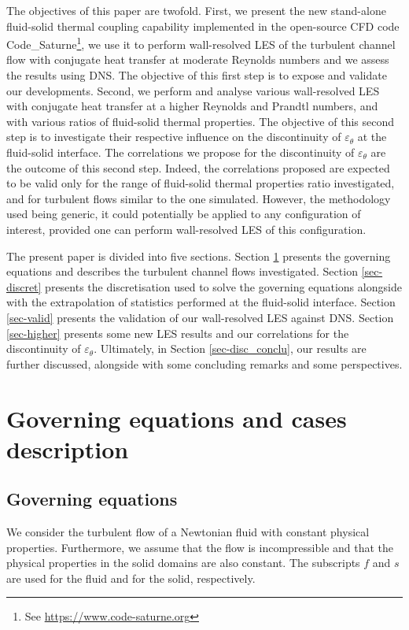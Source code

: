 \documentclass{svjour3}                     %
\begin{document}
The objectives of this paper are twofold.
First, we present the new stand-alone fluid-solid thermal coupling capability implemented in the open-source CFD code {\selectfont Code\_Saturne}\footnote{See \url{https://www.code-saturne.org}}, we use it to perform wall-resolved LES of the turbulent channel flow with conjugate heat transfer at moderate Reynolds numbers and we assess the results using DNS.
The objective of this first step is to expose and validate our developments.
Second, we perform and analyse various wall-resolved LES with conjugate heat transfer at a higher Reynolds and Prandtl numbers, and with various ratios of fluid-solid thermal properties.
The objective of this second step is to investigate their respective influence on the discontinuity of $\varepsilon_\theta$ at the fluid-solid interface.
The correlations we propose for the discontinuity of $\varepsilon_\theta$ are the outcome of this second step.
Indeed, the correlations proposed are expected to be valid only for the range of fluid-solid thermal properties ratio investigated, and for turbulent flows similar to the one simulated.
However, the methodology used being generic, it could potentially be applied to any configuration of interest, provided one can perform wall-resolved LES of this configuration.

The present paper is divided into five sections.
Section \ref{sec-gov_eq_geom} presents the governing equations and describes the turbulent channel flows investigated.
Section \ref{sec-discret} presents the discretisation used to solve the governing equations alongside with the extrapolation of statistics performed at the fluid-solid interface.
Section \ref{sec-valid} presents the validation of our wall-resolved LES against DNS.
Section \ref{sec-higher} presents some new LES results and our correlations for the discontinuity of $\varepsilon_\theta$.
Ultimately, in Section \ref{sec-disc_conclu}, our results are further discussed, alongside with some concluding remarks and some perspectives.

\section{Governing equations and cases description}
\label{sec-gov_eq_geom}

\subsection{Governing equations}
\label{subsec-gov_eq}
We consider the turbulent flow of a Newtonian fluid with constant physical properties.
Furthermore, we assume that the flow is incompressible and that the physical properties in the solid domains are also constant.
The subscripts $f$ and $s$ are used for the fluid and for the solid, respectively.
\end{document}
